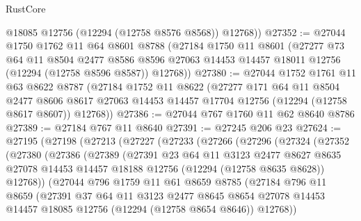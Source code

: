 \begin{lexlean}{RustCore}
\begin{coremodule}
        @18085
        @12756
        (@12294 (@12758 @8576 @8568))
        @12768))
@27352 := @27044
    @1750
    @1762
    @11
    @64
    @8601
    @8788
    (@27184
      @1750
      @11
      @8601
      (@27277
        @73
        @64
        @11
        @8504
        @2477
        @8586
        @8596
        @27063
        @14453
        @14457
        @18011
        @12756
        (@12294 (@12758 @8596 @8587))
        @12768))
@27380 := @27044
    @1752
    @1761
    @11
    @63
    @8622
    @8787
    (@27184
      @1752
      @11
      @8622
      (@27277
        @171
        @64
        @11
        @8504
        @2477
        @8606
        @8617
        @27063
        @14453
        @14457
        @17704
        @12756
        (@12294 (@12758 @8617 @8607))
        @12768))
@27386 := @27044 @767 @1760 @11 @62 @8640 @8786
@27389 := @27184 @767 @11 @8640
@27391 := @27245 @206 @23
@27624 := @27195
    (@27198
      (@27213
        (@27227
          (@27233
            (@27266
              (@27296
                (@27324
                  (@27352
                    (@27380
                      (@27386
                        (@27389
                          (@27391
                            @23
                            @64
                            @11
                            @3123
                            @2477
                            @8627
                            @8635
                            @27078
                            @14453
                            @14457
                            @18188
                            @12756
                            (@12294 (@12758 @8635 @8628))
                            @12768))
                        (@27044
                          @796
                          @1759
                          @11
                          @61
                          @8659
                          @8785
                          (@27184
                            @796
                            @11
                            @8659
                            (@27391
                              @37
                              @64
                              @11
                              @3123
                              @2477
                              @8645
                              @8654
                              @27078
                              @14453
                              @14457
                              @18085
                              @12756
                              (@12294 (@12758 @8654 @8646))
                              @12768))

\end{coremodule}
\end{lexlean}
